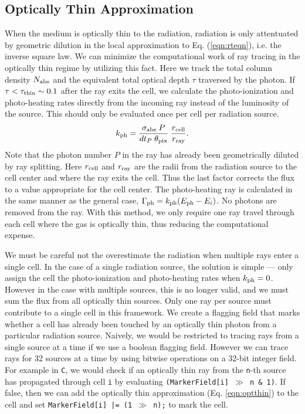 \documentclass[12pt,preprint]{aastex}
\begin{document}
\subsection{Optically Thin Approximation}

When the medium is optically thin to the radiation, radiation is only
attentuated by geometric dilution in the local approximation to
Eq. (\ref{eqn:rteqn}), i.e. the inverse square law.  We can minimize
the computational work of ray tracing in the optically thin regime by
utilizing this fact.  Here we track the total column density $N_{\rm
  abs}$ and the equivalent total optical depth $\tau$ traversed by the
photon.  If $\tau < \tau_{\rm thin} \sim 0.1$ after the ray exits the
cell, we calculate the photo-ionization and photo-heating rates
directly from the incoming ray instead of the luminosity of the
source.  This should only be evaluated once per cell per radiation
source.
\begin{equation}
  \label{eqn:optthin}
  k_{\rm ph} = \frac{\sigma_{\rm abs} \; P}{dt_P \; \theta_{\rm pix}}
  \; \frac{r_{\rm cell}}{r_{\rm ray}}.
\end{equation}
Note that the photon number $P$ in the ray has already been
geometrically diluted by ray splitting.  Here $r_{\rm cell}$ and
$r_{\rm ray}$ are the radii from the radiation source to the cell
center and where the ray exits the cell.  Thus the last factor
corrects the flux to a value appropriate for the cell center.  The
photo-heating ray is calculated in the same manner as the general
case, $\Gamma_{\rm ph} = k_{\rm ph} (E_{\rm ph} - E_i)$.  No photons
are removed from the ray.  With this method, we only require one ray
travel through each cell where the gas is optically thin, thus
reducing the computational expense.

We must be careful not the overestimate the radiation when multiple
rays enter a single cell.  In the case of a single radiation source,
the solution is simple --- only assign the cell the photo-ionization
and photo-heating rates when $k_{\rm ph} = 0$.  However in the case
with multiple sources, this is no longer valid, and we must sum the
flux from all optically thin sources.  Only one ray per source must
contribute to a single cell in this framework.  We create a flagging
field that marks whether a cell has already been touched by an
optically thin photon from a particular radiation source.  Naively, we
would be restricted to tracing rays from a single source at a time if
we use a boolean flagging field.  However we can trace rays for 32
sources at a time by using bitwise operations on a 32-bit integer
field.  For example in \texttt{C}, we would check if an optically thin
ray from the \texttt{n}-th source has propagated through cell
\texttt{i} by evaluating \texttt{(MarkerField[i] $\gg$ n \& 1)}.  If
false, then we can add the optically thin approximation
(Eq. \ref{eqn:optthin}) to the cell and set \texttt{MarkerField[i] |=
  (1 $\gg$ n);} to mark the cell.
\end{document}
